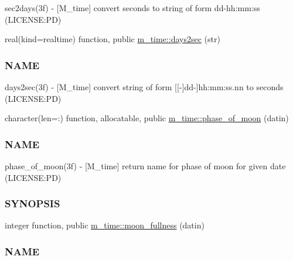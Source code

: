 \begin{DoxyCompactItemize}
\begin{DoxyCompactList}
sec2days(3f) -\/ \mbox{[}M\+\_\+time\mbox{]} convert seconds to string of form dd-\/hh\+:mm\+:ss (L\+I\+C\+E\+N\+SE\+:PD) \end{DoxyCompactList}\item 
real(kind=realtime) function, public \mbox{\hyperlink{namespacem__time_a99393c7906f1989f90ece03969224938}{m\+\_\+time\+::days2sec}} (str)
\begin{DoxyCompactList}\small\item\em \subsubsection*{N\+A\+ME}

days2sec(3f) -\/ \mbox{[}M\+\_\+time\mbox{]} convert string of form \mbox{[}\mbox{[}-\/\mbox{]}dd-\/\mbox{]}hh\+:mm\+:ss.\+nn to seconds (L\+I\+C\+E\+N\+SE\+:PD) \end{DoxyCompactList}\item 
character(len=\+:) function, allocatable, public \mbox{\hyperlink{namespacem__time_ab8a976e2f113cc38b6df80974cee55dc}{m\+\_\+time\+::phase\+\_\+of\+\_\+moon}} (datin)
\begin{DoxyCompactList}\small\item\em \subsubsection*{N\+A\+ME}

phase\+\_\+of\+\_\+moon(3f) -\/ \mbox{[}M\+\_\+time\mbox{]} return name for phase of moon for given date (L\+I\+C\+E\+N\+SE\+:PD) \subsubsection*{S\+Y\+N\+O\+P\+S\+IS}\end{DoxyCompactList}\item 
integer function, public \mbox{\hyperlink{namespacem__time_a702b39998a769b8f60070c0bec975ee2}{m\+\_\+time\+::moon\+\_\+fullness}} (datin)
\begin{DoxyCompactList}\small\item\em \subsubsection*{N\+A\+ME}


\end{DoxyCompactList}
\end{DoxyCompactItemize}
